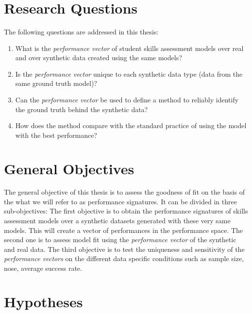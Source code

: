 \section{Research Questions}
\paragraph{}The following questions are addressed in this thesis:

\begin{enumerate}
\item What is the \textit{performance vector} of student skills assessment models over real and over synthetic data created using the same models?
\item Is the \textit{performance vector} unique to each synthetic data type (data from the same ground truth model)?
\item Can the \textit{performance vector} be used to define a method to reliably identify the ground truth behind the synthetic data?
\item How does the method compare with the standard practice of using the model with the best performance? %
\end{enumerate}


\section{General Objectives}

\paragraph{}The general objective of this thesis is to assess the goodness of fit on the basis of the what we will refer to as performance signatures. It can be divided in three sub-objectives: The first objective is to obtain the performance signatures of skills assessment models over a synthetic datasets generated with these very same models. This will create a vector of performances in the performance space. The second one is to assess model fit using the \textit{performance vector} of the synthetic and real data. The third objective is to test the uniqueness and sensitivity of the \textit{performance vectors} on the different data specific conditions such as sample size, nose, average success rate.

\section{Hypotheses}
